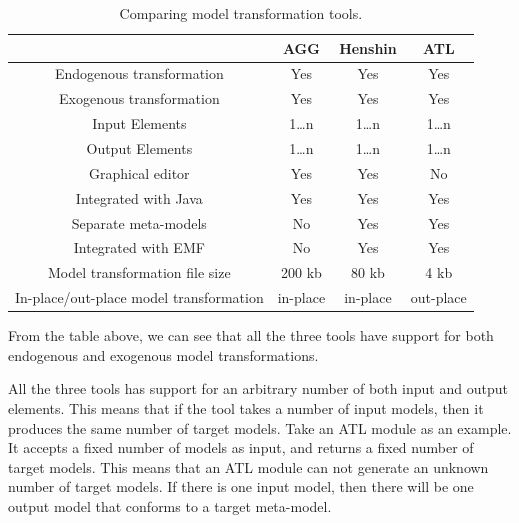 \begin{table}[ht]
\centering
\begin{tabular}{| c | c | c | c |}
\hline
 & AGG & Henshin & ATL \\
\hline
Endogenous transformation & \cellcolor{green!25}Yes &
\cellcolor{green!25}Yes & \cellcolor{green!25}Yes \\

Exogenous transformation & \cellcolor{green!25}Yes &
\cellcolor{green!25}Yes & \cellcolor{green!25}Yes \\

Input Elements & 1\ldots n & 1\ldots n & 1\ldots n\\
Output Elements & 1\ldots n & 1\ldots n & 1\ldots n\\
Graphical editor &\cellcolor{green!25}Yes &
\cellcolor{green!25}Yes &\cellcolor{red!25}No  \\
Integrated with Java & \cellcolor{green!25}Yes &
\cellcolor{green!25}Yes & \cellcolor{green!25}Yes \\
Separate meta-models & \cellcolor{red!25}No &
\cellcolor{green!25}Yes & \cellcolor{green!25}Yes \\
Integrated with EMF & \cellcolor{red!25}No &
\cellcolor{green!25}Yes & \cellcolor{green!25}Yes \\
Model transformation file size &200 kb &80 kb &4 kb \\
In-place/out-place model transformation &in-place &
in-place &out-place \\
\hline

\end{tabular}
\caption [Comparing model transformation tools]
{Comparing model transformation tools.}
\end{table}

\newpage




From the table above, we can see that all the three tools have support
for both endogenous and exogenous model transformations. 

All the three tools has support for an arbitrary number of both input and
output elements. This means that if the tool takes a number of input models, then it
produces the same number of target models. Take an ATL module as an example. It
accepts a fixed number of models as input, and returns a fixed number of target
models. This means that an ATL module can not generate an unknown number of
target models. If there is one input model, then there will be one output model
that conforms to a target meta-model.

